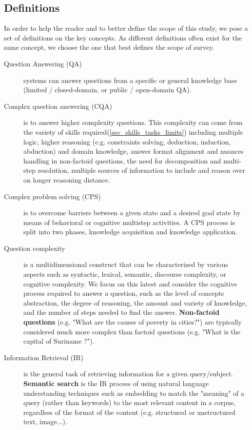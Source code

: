 \documentclass[acmsmall]{acmart}
\begin{document}
\subsection{Definitions}
In order to help the reader and to better define the scope of this study, we pose a set of definitions on the key concepts. As different definitions often exist for the same concept, we choose the one that best defines the scope of survey.
\begin{description}
\item [Question Answering (QA)] systems can answer questions from a specific or general knowledge base (limited / closed-domain, or public / open-domain QA).
\item [Complex question answering (CQA)] is to answer higher complexity questions. This complexity can come from the variety of skills required(\ref{sec_skills_tasks_limits}) including multiple logic, higher reasoning (e.g. constraints solving, deduction, induction, abduction) and domain knowledge, answer format alignment and nuances handling in non-factoid questions, the need for decomposition and multi-step resolution, multiple sources of information to include and reason over on longer reasoning distance.
\item [Complex problem solving (CPS)] is to overcome barriers between a given state and a desired goal state by means of behavioral or cognitive multistep activities\citep{frenschComplexProblemSolving1995}. A CPS process is split into two phases, knowledge acquisition and knowledge application.
\item [Question complexity] is a multidimensional construct that can be characterized by various aspects such as syntactic, lexical, semantic, discourse complexity, or cognitive complexity. We focus on this latest and consider the cognitive process required to answer a question, such as the level of concepts abstraction, the degree of reasoning, the amount and variety of knowledge, and the number of steps needed to find the answer. \textbf{Non-factoid questions} (e.g. "What are the causes of poverty in cities?") are typically considered much more complex than factoid questions (e.g. "What is the capital of Suriname ?").
\item [Information Retrieval (IR)] is the general task of retrieving information for a given query/subject. \textbf{Semantic search} is the IR process of using natural language understanding techniques such as embedding to match the "meaning" of a query (rather than keywords) to the most relevant content in a corpus, regardless of the format of the content (e.g. structured or unstructured text, image...).

\end{description}
\end{document}
